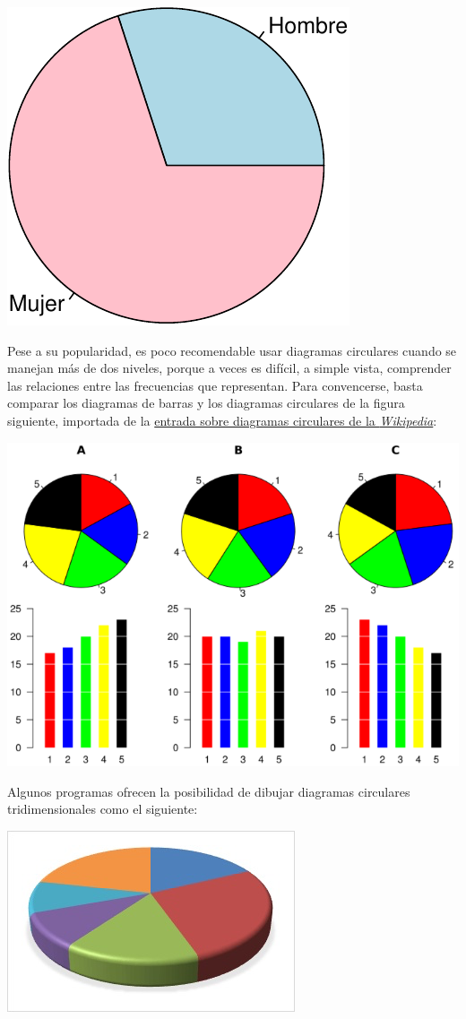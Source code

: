 \documentclass[
]{book}
\theoremstyle{definition}
\theoremstyle{definition}
\theoremstyle{definition}
\theoremstyle{definition}
\theoremstyle{remark}
\begin{document}
\begin{center}\includegraphics[width=0.5\linewidth]{INREMDN_files/figure-latex/unnamed-chunk-209-1} \end{center}

Pese a su popularidad, es poco recomendable usar diagramas circulares cuando se manejan más de dos niveles, porque a veces es difícil, a simple vista, comprender las relaciones entre las frecuencias que representan. Para convencerse, basta comparar los diagramas de barras y los diagramas circulares de la figura siguiente, importada de la \href{http://en.wikipedia.org/wiki/Pie_chart}{entrada sobre diagramas circulares de la \emph{Wikipedia}}:

\begin{center}\includegraphics[width=0.75\linewidth]{INREMDN_files/figure-html/wikipc} \end{center}

Algunos programas ofrecen la posibilidad de dibujar diagramas circulares tridimensionales como el siguiente:

\begin{center}\includegraphics[width=0.75\linewidth]{INREMDN_files/figure-html/3dpiechart} \end{center}
\end{document}
